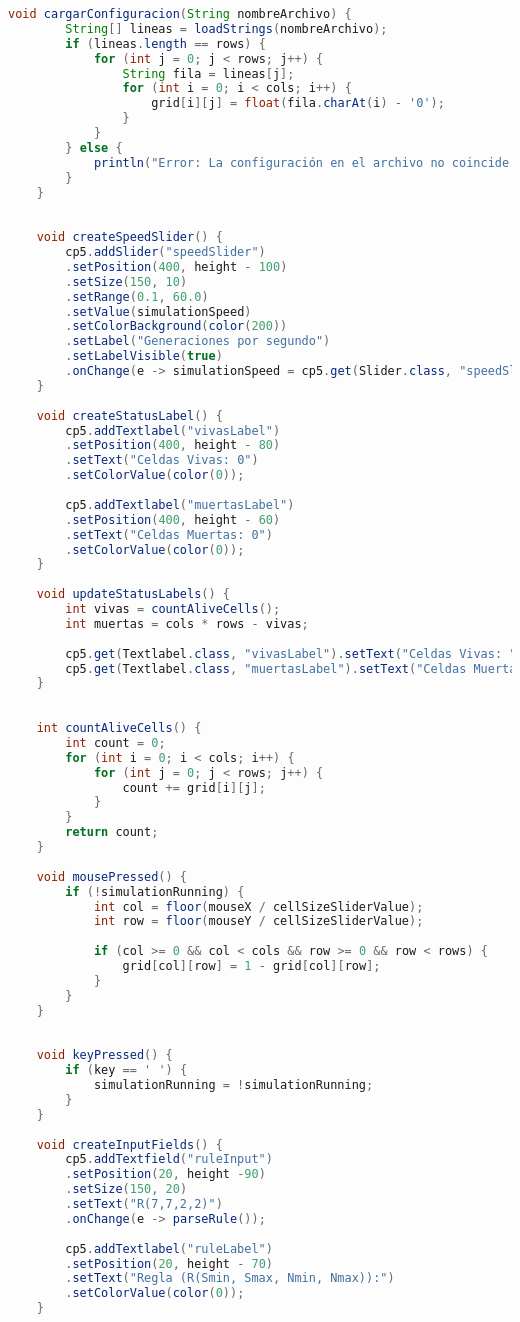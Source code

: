 \documentclass{article}
\begin{document}
\begin{lstlisting}[language=Java, basicstyle=\tiny, breaklines=true, breakatwhitespace=true]
 	void cargarConfiguracion(String nombreArchivo) {
 		String[] lineas = loadStrings(nombreArchivo);
 		if (lineas.length == rows) {
 			for (int j = 0; j < rows; j++) {
 				String fila = lineas[j];
 				for (int i = 0; i < cols; i++) {
 					grid[i][j] = float(fila.charAt(i) - '0');
 				}
 			}
 		} else {
 			println("Error: La configuración en el archivo no coincide con el tamaño de la cuadrícula.");
 		}
 	}
 	
 	
 	void createSpeedSlider() {
 		cp5.addSlider("speedSlider")
 		.setPosition(400, height - 100)
 		.setSize(150, 10)
 		.setRange(0.1, 60.0) 
 		.setValue(simulationSpeed)
 		.setColorBackground(color(200))
 		.setLabel("Generaciones por segundo")
 		.setLabelVisible(true)
 		.onChange(e -> simulationSpeed = cp5.get(Slider.class, "speedSlider").getValue());
 	}
 	
 	void createStatusLabel() {
 		cp5.addTextlabel("vivasLabel")
 		.setPosition(400, height - 80)
 		.setText("Celdas Vivas: 0")
 		.setColorValue(color(0));
 		
 		cp5.addTextlabel("muertasLabel")
 		.setPosition(400, height - 60)
 		.setText("Celdas Muertas: 0")
 		.setColorValue(color(0));
 	}
 	
 	void updateStatusLabels() {
 		int vivas = countAliveCells();
 		int muertas = cols * rows - vivas;
 		
 		cp5.get(Textlabel.class, "vivasLabel").setText("Celdas Vivas: " + vivas);
 		cp5.get(Textlabel.class, "muertasLabel").setText("Celdas Muertas: " + muertas);
 	}
 	
 	
 	int countAliveCells() {
 		int count = 0;
 		for (int i = 0; i < cols; i++) {
 			for (int j = 0; j < rows; j++) {
 				count += grid[i][j];
 			}
 		}
 		return count;
 	}
 	
 	void mousePressed() {
 		if (!simulationRunning) {
 			int col = floor(mouseX / cellSizeSliderValue);
 			int row = floor(mouseY / cellSizeSliderValue);
 			
 			if (col >= 0 && col < cols && row >= 0 && row < rows) {
 				grid[col][row] = 1 - grid[col][row];
 			}
 		}
 	}
 	
 	
 	void keyPressed() {
 		if (key == ' ') {
 			simulationRunning = !simulationRunning;
 		}
 	}
 	
 	void createInputFields() {
 		cp5.addTextfield("ruleInput")
 		.setPosition(20, height -90)
 		.setSize(150, 20)
 		.setText("R(7,7,2,2)")
 		.onChange(e -> parseRule());
 		
 		cp5.addTextlabel("ruleLabel")
 		.setPosition(20, height - 70)
 		.setText("Regla (R(Smin, Smax, Nmin, Nmax)):")
 		.setColorValue(color(0));
 	}
 	

\end{lstlisting}
\end{document}
